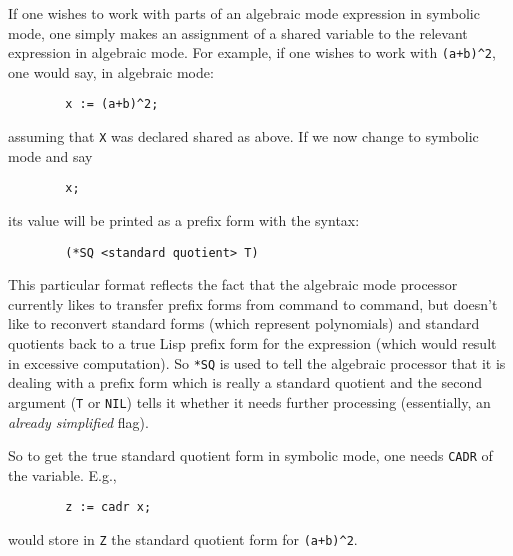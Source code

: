 If one wishes to work with parts of an algebraic mode
 expression in symbolic mode,
one simply makes an assignment of a shared variable to
the relevant expression in algebraic mode.  For example, if one wishes to
work with \texttt{(a+b)\textasciicircum 2}, one would say, in algebraic mode:
\begin{verbatim}
        x := (a+b)^2;
\end{verbatim}
assuming that \texttt{X} was declared shared as above.  If we now change to
symbolic mode and say
\begin{verbatim}
        x;
\end{verbatim}
its value will be printed as a prefix form with the syntax:
\begin{verbatim}
        (*SQ <standard quotient> T)
\end{verbatim}
This particular format reflects the fact that the algebraic mode processor
currently likes to transfer prefix forms from command to command, but
doesn't like to reconvert standard forms (which
represent polynomials) and standard quotients back to a true Lisp prefix
form for the expression (which would result in excessive computation).  So
\texttt{*SQ} is used to tell the algebraic processor that it is dealing with
a prefix form which is really a standard quotient and the second argument (\texttt{T} or \texttt{NIL}) tells it whether
it needs further processing (essentially, an \emph{already simplified}
flag).

So to get the true standard quotient form in symbolic mode, one needs
\texttt{CADR} of the variable. E.g.,
\begin{verbatim}
        z := cadr x;
\end{verbatim}
would store in \texttt{Z} the standard quotient form for 
\texttt{(a+b)\textasciicircum 2}.

